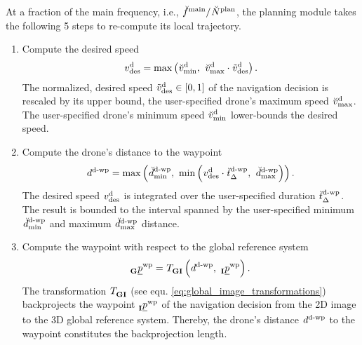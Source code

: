 At a fraction of the main frequency, i.e.,
$\freq[\user]{\main}{}{}{} / \num[\user]{\text{plan}}{}{}{}$, 
the planning module takes the following 5 steps 
to re-compute its local trajectory.
\begin{enumerate}
    \item Compute the desired speed
    \begin{equation} \label{eq:planning_des_speed}
        \speed[]{\drone}{\desired}{}{}
        = 
        \maxof{
            \speed[\user]{\drone}{\mnm}{}{}
        }{
            \speed[\user]{\drone}{\mxm}{}{}
            \cdot 
            \speed[\norm]{\drone}{\desired}{}{}
        }.
    \end{equation}
    The normalized, desired speed 
    $\speed[\norm]{\drone}{\desired}{}{} \in \left[0, 1\right]$ 
    of the navigation decision
    is rescaled by its upper bound, 
    the user-specified drone's maximum speed 
    $\speed[\user]{\drone}{\mxm}{}{}$.    
    The user-specified drone's minimum speed 
    $\speed[\user]{\drone}{\mnm}{}{}$
    lower-bounds the desired speed.

    \item Compute the drone's distance to the waypoint 
    \begin{equation}
        \dist[]{\dronetowayp}{}{}{}
        = 
        \maxof{
            \dist[\user]{\dronetowayp}{\mnm}{}{}
        }{
            \minof{
                \speed[]{\drone}{\desired}{}{}
                \cdot
                \dur[\user]{\dronetowayp}{}{}{}
            }{
                \dist[\user]{\dronetowayp}{\mxm}{}{}
            }
        }.
    \end{equation}
    The desired speed 
    $\speed[]{\drone}{\desired}{}{}$ 
    is integrated over the user-specified duration
    $\dur[\user]{\dronetowayp}{}{}{}$.
    The result is bounded to the interval spanned 
    by the user-specified minimum
    $\dist[\user]{\dronetowayp}{\mnm}{}{}$
    and maximum
    $\dist[\user]{\dronetowayp}{\mxm}{}{}$
    distance.

    \item Compute the waypoint with respect to the global reference system
    \begin{equation} \label{eq:pl_global_wayp}
        \pos[]{\wayp}{}{\grs}{}
        = 
        \trafo[]{}{\grs\irs}{}{} \left(
            \dist[]{\dronetowayp}{}{}{}
            ,\ 
            \pos[]{\wayp}{}{\irs}{}
        \right).
    \end{equation}
    The transformation
    $\trafo[]{}{\grs\irs}{}{}$
    (see equ. \ref{eq:global_image_transformations})
    backprojects the waypoint
    $\pos[]{\wayp}{}{\irs}{}$ 
    of the navigation decision
    from the 2D image to the 3D global reference system.
    Thereby, the drone's distance 
    $\dist[]{\dronetowayp}{}{}{}$
    to the waypoint
    constitutes the backprojection length.
    

\end{enumerate}
